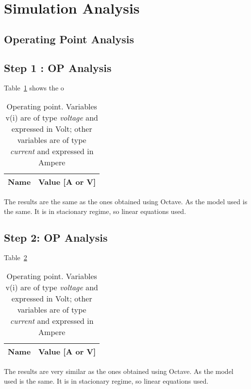 \section{Simulation Analysis}
\label{sec:simulation}

\subsection{Operating Point Analysis}

\subsection{Step 1 : OP Analysis}

Table~\ref{tab:op1} shows the o

\begin{table}[H]
  \centering
  \begin{tabular}{|l|r|}
    \hline    
    {\bf Name} & {\bf Value [A or V]} \\ \hline
    
  \end{tabular}
  \caption{Operating point. Variables v(i) are of type {\it voltage} and expressed in
    Volt; other variables are of type {\it current} and expressed in Ampere}
  \label{tab:op1}
\end{table}

The results are the same as the ones obtained using Octave. As the model used is the same. 
It is in stacionary regime, so linear equations used.


\subsection{Step 2: OP Analysis}

Table~\ref{tab:op2}

\begin{table}[H]
  \centering
  \begin{tabular}{|l|r|}
    \hline    
    {\bf Name} & {\bf Value [A or V]} \\ \hline
    
  \end{tabular}
  \caption{Operating point. Variables v(i) are of type {\it voltage} and expressed in
    Volt; other variables are of type {\it current} and expressed in Ampere}
  \label{tab:op2}
\end{table}

The results are very similar as the ones obtained using Octave. As the model used is the same. 
It is in stacionary regime, so linear equations used.



